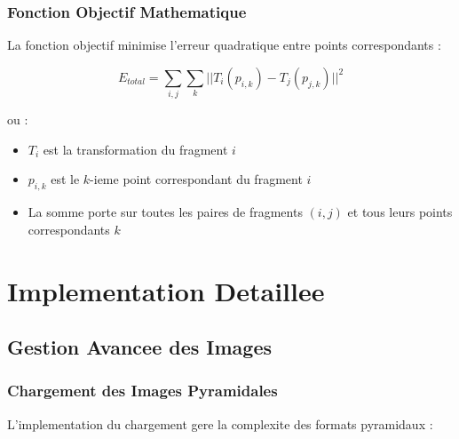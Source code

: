 \documentclass[12pt,a4paper]{article}
\begin{document}
\subsubsection{Fonction Objectif Mathematique}

La fonction objectif minimise l'erreur quadratique entre points correspondants :

\begin{equation}
E_{total} = \sum_{i,j} \sum_{k} ||T_i(p_{i,k}) - T_j(p_{j,k})||^2
\end{equation}

ou :
\begin{itemize}
\item $T_i$ est la transformation du fragment $i$
\item $p_{i,k}$ est le $k$-ieme point correspondant du fragment $i$
\item La somme porte sur toutes les paires de fragments $(i,j)$ et tous leurs points correspondants $k$
\end{itemize}

\section{Implementation Detaillee}

\subsection{Gestion Avancee des Images}

\subsubsection{Chargement des Images Pyramidales}

L'implementation du chargement gere la complexite des formats pyramidaux :
\end{document}
